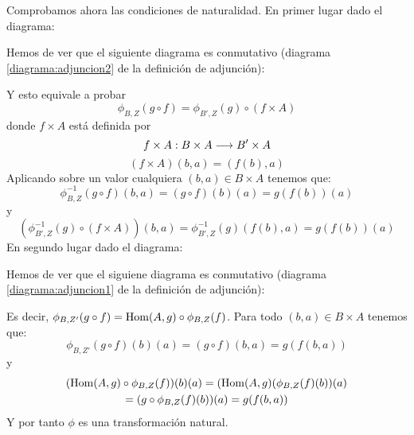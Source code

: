 Comprobamos ahora las condiciones de naturalidad. En primer lugar dado
el diagrama:
\begin{center}
\end{center}
Hemos de ver que el siguiente diagrama es conmutativo (diagrama
\eqref{diagrama:adjuncion2} de la definición de adjunción):
\begin{center}
\end{center}
Y esto equivale a probar
$$\phi_{B,  Z}(g \circ f) = \phi_{B', Z}(g) \circ (f\times A)$$
donde $f \times A$ está definida por
$$f\times A: B\times A\longrightarrow B'\times A$$
$$(f\times A)(b, a) = (f(b), a)$$
Aplicando sobre un valor cualquiera
$(b, a) \in B\times A$ tenemos que:
$$\phi_{B, Z}^{-1}(g \circ f)(b, a) = (g\circ f)(b)(a) = g(f(b))(a)$$
y
$$(\phi_{B', Z}^{-1}(g) \circ (f\times A))(b, a) =
   \phi_{B', Z}^{-1}(g)(f(b), a) = g(f(b))(a)$$
En segundo lugar dado el diagrama:
\begin{center}
\end{center}
Hemos de ver que el siguiene diagrama es conmutativo
(diagrama \eqref{diagrama:adjuncion1} de la definición de adjunción):
\begin{center}
\end{center}
Es decir, $\phi_{B, Z'}(g \circ f) = \operatorname{Hom}(A, g) \circ \phi_{B, Z}(f)$. Para
todo
$(b, a) \in B\times A$ tenemos que:
$$\phi_{B, Z'}(g \circ f)(b)(a) = (g\circ f)(b, a) = g(f(b, a))$$
y
\begin{multline*}
(\operatorname{Hom}(A, g)\circ\phi_{B, Z}(f))(b)(a) = (\operatorname{Hom}(A, g)(\phi_{B, Z}(f)(b))(a)\\
  = (g \circ \phi_{B,Z}(f)(b))(a) = g(f(b, a))
\end{multline*}
Y por tanto $\phi$ es una transformación natural.

